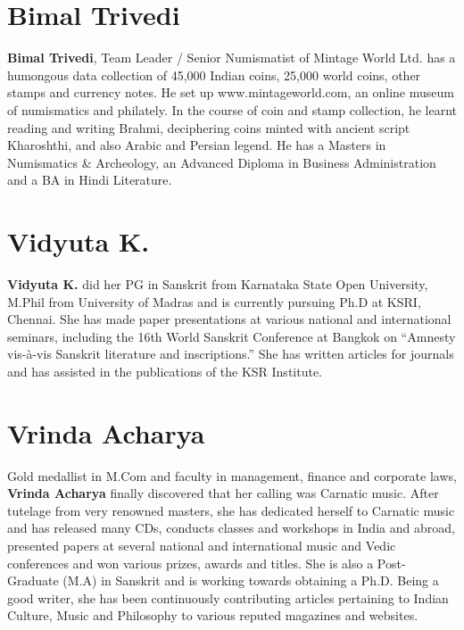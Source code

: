 \section*{Bimal Trivedi}

\vskip -2pt

\textbf{Bimal Trivedi}, Team Leader / Senior Numismatist of Mintage World Ltd. has a humongous data collection of 45,000 Indian coins, 25,000 world coins, other stamps and currency notes. He set up www.mintageworld.com, an online museum of numismatics and philately. In the course of coin and stamp collection, he learnt reading and writing Brahmi, deciphering coins minted with ancient script Kharoshthi, and also Arabic and Persian legend. He has a Masters in Numismatics \& Archeology, an Advanced Diploma in Business Administration and a BA in Hindi Literature.

\section*{Vidyuta K.}

\vskip -2pt

\textbf{Vidyuta K.} did her PG in Sanskrit from Karnataka State Open University, M.Phil from University of Madras and is currently pursuing Ph.D at KSRI, Chennai. She has made paper presentations at various national and international seminars, including the 16th World Sanskrit Conference at Bangkok on “Amnesty vis-à-vis Sanskrit literature and inscriptions.” She has written articles for journals and has assisted in the publications of the KSR Institute.

\section*{Vrinda Acharya}

Gold medallist in M.Com and faculty in management, finance and corporate laws, \textbf{Vrinda Acharya} finally discovered that her calling was Carnatic music. After tutelage from very renowned masters, she has dedicated herself to Carnatic music and has released many CDs, conducts classes and workshops in India and abroad, presented papers at several national and international music and Vedic conferences and won various prizes, awards and titles. She is also a Post- Graduate (M.A) in Sanskrit and is working towards obtaining a Ph.D. Being a good writer, she has been continuously contributing articles pertaining to Indian Culture, Music and Philosophy to various reputed magazines and websites. 

